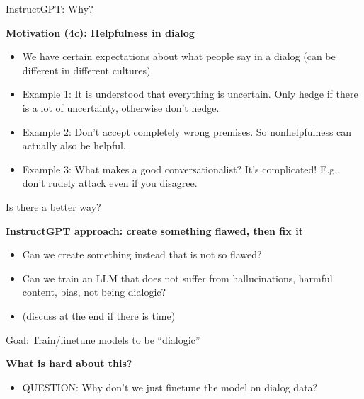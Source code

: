 \begin{vbframe}{InstructGPT: Why?}

\vfill

\textbf{Motivation (4c): Helpfulness in dialog}

	\begin{itemize}
		\item We have certain expectations about
		what people say in a dialog (can be
		different in different cultures). 
		\item Example 1: It is understood that
		everything is uncertain. Only hedge if there
		is a lot of uncertainty, otherwise don't hedge.
                \item Example 2: Don't
		accept completely wrong premises. So
		nonhelpfulness can actually also be helpful.
		\item Example 3: What makes a good
		conversationalist? It's complicated! E.g.,
                don't rudely attack even
		if you disagree.
	\end{itemize}

\vfill

\end{vbframe}


\begin{vbframe}{Is there a better way?}

\vfill

\textbf{InstructGPT approach: create something flawed, then fix it}

	\begin{itemize}
		\item Can we create something instead that
		is not so flawed?
                \item Can we train an LLM that does not
		suffer from hallucinations, harmful content,
		bias, not being dialogic?
\item (discuss at the end if there is time)
	\end{itemize}

\vfill

\end{vbframe}



\begin{vbframe}{Goal: Train/finetune models to be ``dialogic''}

\vfill

\textbf{What is hard about this?}

	\begin{itemize}
		\item QUESTION: Why don't we just finetune the model
		on dialog data?
	\end{itemize}

\vfill

\end{vbframe}


